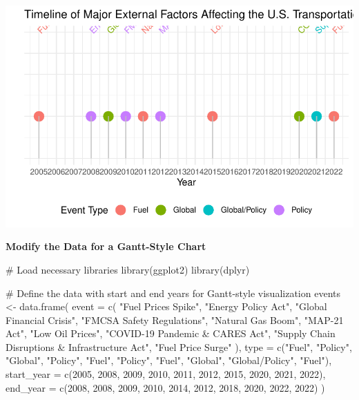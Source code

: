 \documentclass[
  letterpaper,
  DIV=11,
  numbers=noendperiod]{scrreprt}
\newenvironment{Shaded}{\begin{snugshade}}{\end{snugshade}}
\newcommand{\AttributeTok}[1]{\textcolor[rgb]{0.40,0.45,0.13}{#1}}
\newcommand{\CommentTok}[1]{\textcolor[rgb]{0.37,0.37,0.37}{#1}}
\newcommand{\DecValTok}[1]{\textcolor[rgb]{0.68,0.00,0.00}{#1}}
\newcommand{\FunctionTok}[1]{\textcolor[rgb]{0.28,0.35,0.67}{#1}}
\newcommand{\NormalTok}[1]{\textcolor[rgb]{0.00,0.23,0.31}{#1}}
\newcommand{\OtherTok}[1]{\textcolor[rgb]{0.00,0.23,0.31}{#1}}
\newcommand{\StringTok}[1]{\textcolor[rgb]{0.13,0.47,0.30}{#1}}
\begin{document}
\includegraphics{FinalProject_Toluwanimi_files/figure-pdf/unnamed-chunk-5-1.pdf}

\textbf{Modify the Data for a Gantt-Style Chart}

\begin{Shaded}
\begin{Highlighting}[]
\CommentTok{\# Load necessary libraries}
\FunctionTok{library}\NormalTok{(ggplot2)}
\FunctionTok{library}\NormalTok{(dplyr)}

\CommentTok{\# Define the data with start and end years for Gantt{-}style visualization}
\NormalTok{events }\OtherTok{\textless{}{-}} \FunctionTok{data.frame}\NormalTok{(}
  \AttributeTok{event =} \FunctionTok{c}\NormalTok{(}
    \StringTok{"Fuel Prices Spike"}\NormalTok{, }\StringTok{"Energy Policy Act"}\NormalTok{, }\StringTok{"Global Financial Crisis"}\NormalTok{,}
    \StringTok{"FMCSA Safety Regulations"}\NormalTok{, }\StringTok{"Natural Gas Boom"}\NormalTok{, }\StringTok{"MAP{-}21 Act"}\NormalTok{,}
    \StringTok{"Low Oil Prices"}\NormalTok{, }\StringTok{"COVID{-}19 Pandemic \& CARES Act"}\NormalTok{, }
    \StringTok{"Supply Chain Disruptions \& Infrastructure Act"}\NormalTok{, }\StringTok{"Fuel Price Surge"}
\NormalTok{  ),}
  \AttributeTok{type =} \FunctionTok{c}\NormalTok{(}\StringTok{"Fuel"}\NormalTok{, }\StringTok{"Policy"}\NormalTok{, }\StringTok{"Global"}\NormalTok{, }\StringTok{"Policy"}\NormalTok{, }\StringTok{"Fuel"}\NormalTok{, }\StringTok{"Policy"}\NormalTok{, }\StringTok{"Fuel"}\NormalTok{, }\StringTok{"Global"}\NormalTok{, }\StringTok{"Global/Policy"}\NormalTok{, }\StringTok{"Fuel"}\NormalTok{),}
  \AttributeTok{start\_year =} \FunctionTok{c}\NormalTok{(}\DecValTok{2005}\NormalTok{, }\DecValTok{2008}\NormalTok{, }\DecValTok{2009}\NormalTok{, }\DecValTok{2010}\NormalTok{, }\DecValTok{2011}\NormalTok{, }\DecValTok{2012}\NormalTok{, }\DecValTok{2015}\NormalTok{, }\DecValTok{2020}\NormalTok{, }\DecValTok{2021}\NormalTok{, }\DecValTok{2022}\NormalTok{),}
  \AttributeTok{end\_year =} \FunctionTok{c}\NormalTok{(}\DecValTok{2008}\NormalTok{, }\DecValTok{2008}\NormalTok{, }\DecValTok{2009}\NormalTok{, }\DecValTok{2010}\NormalTok{, }\DecValTok{2014}\NormalTok{, }\DecValTok{2012}\NormalTok{, }\DecValTok{2018}\NormalTok{, }\DecValTok{2020}\NormalTok{, }\DecValTok{2022}\NormalTok{, }\DecValTok{2022}\NormalTok{)}
\NormalTok{)}
\end{Highlighting}
\end{Shaded}
\end{document}
